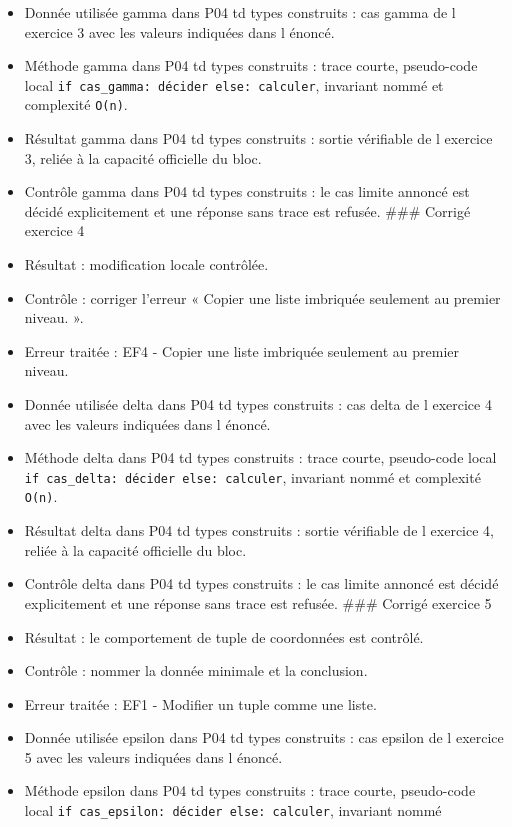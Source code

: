 \begin{itemize}
\item
  Donnée utilisée gamma dans P04 td types construits : cas gamma de l
  exercice 3 avec les valeurs indiquées dans l énoncé.
\item
  Méthode gamma dans P04 td types construits : trace courte, pseudo-code
  local \texttt{if\ cas\_gamma:\ décider\ else:\ calculer}, invariant
  nommé et complexité \texttt{O(n)}.
\item
  Résultat gamma dans P04 td types construits : sortie vérifiable de l
  exercice 3, reliée à la capacité officielle du bloc.
\item
  Contrôle gamma dans P04 td types construits : le cas limite annoncé
  est décidé explicitement et une réponse sans trace est refusée. \#\#\#
  Corrigé exercice 4
\item
  Résultat : modification locale contrôlée.
\item
  Contrôle : corriger l'erreur « Copier une liste imbriquée seulement au
  premier niveau. ».
\item
  Erreur traitée : EF4 - Copier une liste imbriquée seulement au premier
  niveau.
\item
  Donnée utilisée delta dans P04 td types construits : cas delta de l
  exercice 4 avec les valeurs indiquées dans l énoncé.
\item
  Méthode delta dans P04 td types construits : trace courte, pseudo-code
  local \texttt{if\ cas\_delta:\ décider\ else:\ calculer}, invariant
  nommé et complexité \texttt{O(n)}.
\item
  Résultat delta dans P04 td types construits : sortie vérifiable de l
  exercice 4, reliée à la capacité officielle du bloc.
\item
  Contrôle delta dans P04 td types construits : le cas limite annoncé
  est décidé explicitement et une réponse sans trace est refusée. \#\#\#
  Corrigé exercice 5
\item
  Résultat : le comportement de tuple de coordonnées est contrôlé.
\item
  Contrôle : nommer la donnée minimale et la conclusion.
\item
  Erreur traitée : EF1 - Modifier un tuple comme une liste.
\item
  Donnée utilisée epsilon dans P04 td types construits : cas epsilon de
  l exercice 5 avec les valeurs indiquées dans l énoncé.
\item
  Méthode epsilon dans P04 td types construits : trace courte,
  pseudo-code local
  \texttt{if\ cas\_epsilon:\ décider\ else:\ calculer}, invariant nommé

\end{itemize}
